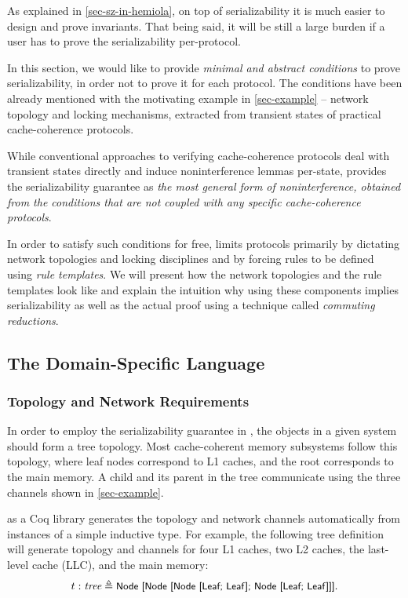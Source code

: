 \documentclass[sigplan,10pt,review,anonymous,screen]{acmart}\settopmatter{printfolios=true,printccs=false,printacmref=false}
\begin{document}
As explained in \autoref{sec-sz-in-hemiola}, on top of serializability it is much easier to design and prove invariants.
That being said, it will be still a large burden if a user has to prove the serializability per-protocol.

In this section, we would like to provide \emph{minimal and abstract conditions} to prove serializability, in order not to prove it for each protocol.
The conditions have been already mentioned with the motivating example in \autoref{sec-example} -- network topology and locking mechanisms, extracted from transient states of practical cache-coherence protocols.

While conventional approaches to verifying cache-coherence protocols deal with transient states directly and induce noninterference lemmas per-state, \hemiola{} provides the serializability guarantee as \emph{the most general form of noninterference, obtained from the conditions that are not coupled with any specific cache-coherence protocols}.

In order to satisfy such conditions for free, \hemiola{} limits protocols primarily by dictating network topologies and locking disciplines and by forcing rules to be defined using \emph{rule templates}.
We will present how the network topologies and the rule templates look like and explain the intuition why using these components implies serializability as well as the actual proof using a technique called \emph{commuting reductions}.

\subsection{The Domain-Specific Language}

\subsubsection{Topology and Network Requirements}
\label{sec-topo-net-reqs}

In order to employ the serializability guarantee in \hemiola{}, the objects in a given system should form a tree topology.
Most cache-coherent memory subsystems follow this topology, where leaf nodes correspond to L1 caches, and the root corresponds to the main memory.
A child and its parent in the tree communicate using the three channels shown in \autoref{sec-example}.

\hemiola{} as a Coq library generates the topology and network channels automatically from instances of a simple inductive type.
For example, the following tree definition will generate topology and channels for four L1 caches, two L2 caches, the last-level cache (LLC), and the main memory:
\begin{displaymath}
  t : \textit{tree} \triangleq \small{\textsf{Node [Node [Node [Leaf; Leaf]; Node [Leaf; Leaf]]]}}.
\end{displaymath}
\end{document}

